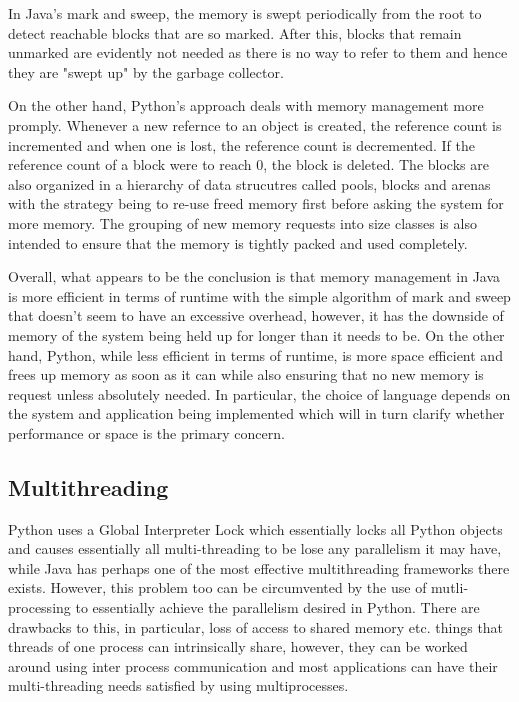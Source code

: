 \noindent In Java's mark and sweep, the memory is swept periodically from the root to detect reachable blocks that are so marked. After this, blocks that remain unmarked are evidently not needed as there is no way to refer to them and hence they are "swept up" by the garbage collector. \newline

\noindent On the other hand, Python's approach deals with memory management more promply. Whenever a new refernce to an object is created, the reference count is incremented and when one is lost, the reference count is decremented. If the reference count of a block were to reach 0, the block is deleted. The blocks are also organized in a hierarchy of data strucutres called pools, blocks and arenas with the strategy being to re-use freed memory first before asking the system for more memory. The grouping of new memory requests into size classes is also intended to ensure that the memory is tightly packed and used completely. 

\noindent Overall, what appears to be the conclusion is that memory management in Java is more efficient in terms of runtime with the simple algorithm of mark and sweep that doesn't seem to have an excessive overhead, however, it has the downside of memory of the system being held up for longer than it needs to be. On the other hand, Python, while less efficient in terms of runtime, is more space efficient and frees up memory as soon as it can while also ensuring that no new memory is request unless absolutely needed. In particular, the choice of language depends on the system and application being implemented which will in turn clarify whether performance or space is the primary concern. 

\subsection{Multithreading}

Python uses a Global Interpreter Lock which essentially locks all Python objects and causes essentially all multi-threading to be lose any parallelism it may have, while Java has perhaps one of the most effective multithreading frameworks there exists. However, this problem too can be circumvented by the use of mutli-processing to essentially achieve the parallelism desired in Python. There are drawbacks to this, in particular, loss of access to shared memory etc. things that threads of one process can intrinsically share, however, they can be worked around using inter process communication and most applications can have their multi-threading needs satisfied by using multiprocesses. 

